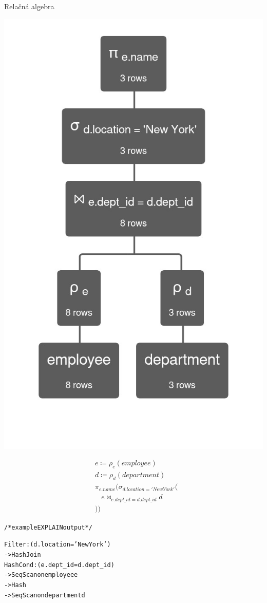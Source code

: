 \documentclass[12pt]{beamer}
\begin{document}
\begin{frame}[fragile]{Relačná algebra}
\begin{minipage}{.45\textwidth}
\includegraphics[scale=.18]{query3.jpg}
\end{minipage}
\begin{minipage}{.45\textwidth}
\begin{align*}
& e \coloneqq \rho_e(employee) \\
& d \coloneqq \rho_d(department) \\
& \pi_{e.name}(\sigma_{d.location = 'New York'}( \\
& \phantom{\ \ \ \ } e\bowtie_{e.dept\_id = d.dept\_id} d \\
& ))
\end{align*}
\smallskip

\begin{scriptsize}
\begin{alltt}
/* example EXPLAIN output */

Filter: (d.location = 'New York')
  -> Hash Join
     Hash Cond: (e.dept_id = d.dept_id)
     -> Seq Scan on employee e
     -> Hash
        -> Seq Scan on department d
\end{alltt}
\end{scriptsize}
\end{minipage}
\end{frame}
\end{document}
